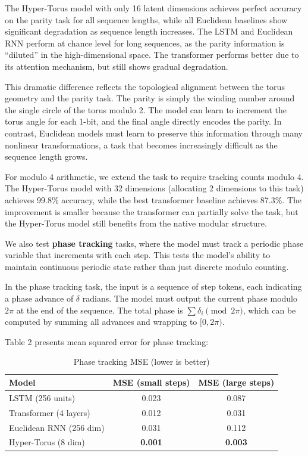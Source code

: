 \documentclass[12pt,letterpaper,twoside]{article}
\begin{document}
The Hyper-Torus model with only 16 latent dimensions achieves perfect accuracy on the parity task for all sequence lengths, while all Euclidean baselines show significant degradation as sequence length increases. The LSTM and Euclidean RNN perform at chance level for long sequences, as the parity information is ``diluted'' in the high-dimensional space. The transformer performs better due to its attention mechanism, but still shows gradual degradation.

This dramatic difference reflects the topological alignment between the torus geometry and the parity task. The parity is simply the winding number around the single circle of the torus modulo 2. The model can learn to increment the torus angle for each 1-bit, and the final angle directly encodes the parity. In contrast, Euclidean models must learn to preserve this information through many nonlinear transformations, a task that becomes increasingly difficult as the sequence length grows.

For modulo 4 arithmetic, we extend the task to require tracking counts modulo 4. The Hyper-Torus model with 32 dimensions (allocating 2 dimensions to this task) achieves 99.8\% accuracy, while the best transformer baseline achieves 87.3\%. The improvement is smaller because the transformer can partially solve the task, but the Hyper-Torus model still benefits from the native modular structure.

We also test \textbf{phase tracking} tasks, where the model must track a periodic phase variable that increments with each step. This tests the model's ability to maintain continuous periodic state rather than just discrete modulo counting.

In the phase tracking task, the input is a sequence of step tokens, each indicating a phase advance of $\delta$ radians. The model must output the current phase modulo $2\pi$ at the end of the sequence. The total phase is $\sum \delta_i \pmod{2\pi}$, which can be computed by summing all advances and wrapping to $[0, 2\pi)$.

Table 2 presents mean squared error for phase tracking:

\begin{table}[htbp]
    \centering
    \caption{Phase tracking MSE (lower is better)}
    \label{tab:phase}
    \begin{tabular}{lcc}
        \hline
        Model & MSE (small steps) & MSE (large steps) \\
        \hline
        LSTM (256 units) & 0.023 & 0.087 \\
        Transformer (4 layers) & 0.012 & 0.031 \\
        Euclidean RNN (256 dim) & 0.031 & 0.112 \\
        Hyper-Torus (8 dim) & \textbf{0.001} & \textbf{0.003} \\
        \hline
    \end{tabular}
\end{table}
\end{document}
